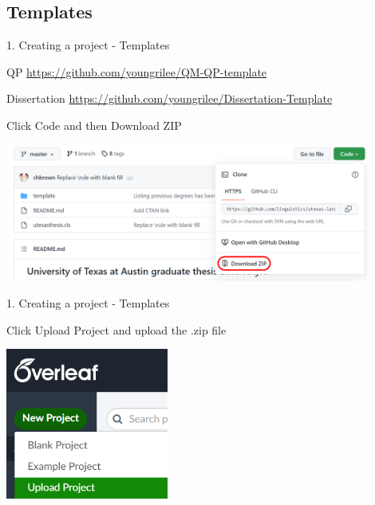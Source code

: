 \documentclass[13pt]{beamer}
\newcommand{\itemA}{\item[\textcolor{black}{\textbullet}]}
\newcommand{\itemB}{\item[\textcolor{black}{\textopenbullet}]}
\newcommand{\green}{\textcolor{colorgreen}}
\begin{document}
\subsection{Templates}
\begin{frame}{1. Creating a project - Templates} 

 \begin{fullpageitemize}
    \itemA QP
    \green{\scriptsize{\url{https://github.com/youngrilee/QM-QP-template}}}
    \itemA Dissertation \green{\scriptsize{\url{https://github.com/youngrilee/Dissertation-Template}}}\hfill \break
    \begin{fullpageitemize}
    \itemB Click \green{Code} and then \green{Download ZIP}
    \end{fullpageitemize}
    \includegraphics[width=0.9\textwidth,keepaspectratio]{images/git_download.png}
 \end{fullpageitemize}
 
\end{frame}

\begin{frame}{1. Creating a project - Templates} 

 \begin{fullpageitemize}
    \itemA  Click \green{Upload Project} and upload the .zip file \hfill \break 
    
    \includegraphics[width=0.4\textwidth,keepaspectratio]{images/upload_proj.png}
 \end{fullpageitemize}
 
\end{frame}
\end{document}
